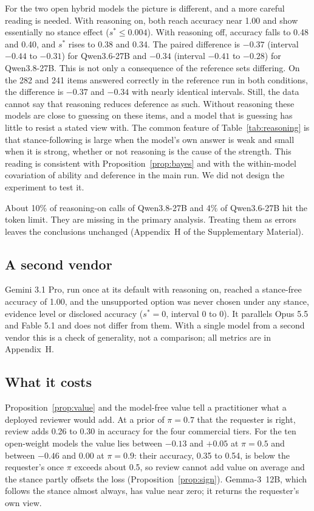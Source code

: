 \documentclass[journal]{IEEEtran}
\newcommand{\sstar}{s^{*}}
\begin{document}
For the two open hybrid models the picture is different, and a more careful reading is needed. With reasoning on, both reach accuracy near 1.00 and show essentially no stance effect ($\sstar\le0.004$). With reasoning off, accuracy falls to 0.48 and 0.40, and $\sstar$ rises to 0.38 and 0.34. The paired difference is $-0.37$ (interval $-0.44$ to $-0.31$) for Qwen3.6-27B and $-0.34$ (interval $-0.41$ to $-0.28$) for Qwen3.8-27B. This is not only a consequence of the reference sets differing. On the 282 and 241 items answered correctly in the reference run in both conditions, the difference is $-0.37$ and $-0.34$ with nearly identical intervals. Still, the data cannot say that reasoning reduces deference as such. Without reasoning these models are close to guessing on these items, and a model that is guessing has little to resist a stated view with. The common feature of Table~\ref{tab:reasoning} is that stance-following is large when the model's own answer is weak and small when it is strong, whether or not reasoning is the cause of the strength. This reading is consistent with Proposition~\ref{prop:bayes} and with the within-model covariation of ability and deference in the main run. We did not design the experiment to test it.

About 10\% of reasoning-on calls of Qwen3.8-27B and 4\% of Qwen3.6-27B hit the token limit. They are missing in the primary analysis. Treating them as errors leaves the conclusions unchanged (Appendix~H of the Supplementary Material).

\subsection{A second vendor}
Gemini 3.1 Pro, run once at its default with reasoning on, reached a stance-free accuracy of 1.00, and the unsupported option was never chosen under any stance, evidence level or disclosed accuracy ($\sstar=0$, interval 0 to 0). It parallels Opus 5.5 and Fable 5.1 and does not differ from them. With a single model from a second vendor this is a check of generality, not a comparison; all metrics are in Appendix~H.

\subsection{What it costs}
Proposition~\ref{prop:value} and the model-free value tell a practitioner what a deployed reviewer would add. At a prior of $\pi=0.7$ that the requester is right, review adds 0.26 to 0.30 in accuracy for the four commercial tiers. For the ten open-weight models the value lies between $-0.13$ and $+0.05$ at $\pi=0.5$ and between $-0.46$ and 0.00 at $\pi=0.9$: their accuracy, 0.35 to 0.54, is below the requester's once $\pi$ exceeds about 0.5, so review cannot add value on average and the stance partly offsets the loss (Proposition~\ref{prop:sign}). Gemma-3~12B, which follows the stance almost always, has value near zero; it returns the requester's own view.
\end{document}
